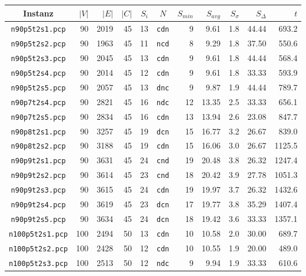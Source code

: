 \documentclass[paper=a4,fontsize=12pt]{scrartcl}
\begin{document}
\begin{table}[!htbp]
\centering
\begin{tabular}{c|rrr|r|c|rrr|r|r}
Instanz & $|V|$ & $|E|$ & $|C|$ & $S_i$ & $N$ & $S_{min}$ & $S_{avg}$ & $S_{\sigma}$ & $S_{\Delta}$ & $t$ \\
\hline\hline
\texttt{n90p5t2s1.pcp} & 90	& 2019	& 45 & 13 & \texttt{cdn} & 9 & 9.61 & 1.8 & 44.44 & 693.2\\
\texttt{n90p5t2s2.pcp} & 90	& 1963	& 45 & 11 & \texttt{ncd} & 8 & 9.29 & 1.8 & 37.50 & 550.6\\
\texttt{n90p5t2s3.pcp} & 90	& 2045	& 45 & 13 & \texttt{cdn} & 9 & 9.61 & 1.8 & 44.44 & 568.4\\
\texttt{n90p5t2s4.pcp} & 90	& 2014	& 45 & 12 & \texttt{cdn} & 9 & 9.61 & 1.8 & 33.33 & 593.9\\
\texttt{n90p5t2s5.pcp} & 90	& 2057	& 45 & 13 & \texttt{dnc} & 9 & 9.87 & 1.9 & 44.44 & 789.7\\
\texttt{n90p7t2s4.pcp} & 90	& 2821	& 45 & 16 & \texttt{ndc} & 12 & 13.35 & 2.5 & 33.33 & 656.1\\
\texttt{n90p7t2s5.pcp} & 90	& 2834	& 45 & 16 & \texttt{cdn} & 13 & 13.94 & 2.6 & 23.08 & 847.7\\
\texttt{n90p8t2s1.pcp} & 90	& 3257	& 45 & 19 & \texttt{dcn} & 15 & 16.77 & 3.2 & 26.67 & 839.0\\
\texttt{n90p8t2s2.pcp} & 90	& 3188	& 45 & 19 & \texttt{cdn} & 15 & 16.06 & 3.0 & 26.67 & 1125.5\\
\texttt{n90p9t2s1.pcp} & 90	& 3631	& 45	& 24 & \texttt{cnd} & 19 & 20.48 & 3.8 & 26.32 & 1247.4\\
\texttt{n90p9t2s2.pcp} & 90	& 3614	& 45	& 23 & \texttt{cnd} & 18 & 20.42 & 3.9 & 27.78 & 1051.3\\
\texttt{n90p9t2s3.pcp} & 90	& 3615	& 45	& 24 & \texttt{cdn} & 19 & 19.97 & 3.7 & 26.32 & 1432.6\\
\texttt{n90p9t2s4.pcp} & 90	& 3619	& 45	& 23 & \texttt{dcn} & 17 & 19.77 & 3.8 & 35.29 & 1407.4\\
\texttt{n90p9t2s5.pcp} & 90	& 3634	& 45	& 24 & \texttt{dcn} & 18 & 19.42 & 3.6 & 33.33 & 1357.1\\
\texttt{n100p5t2s1.pcp} & 100	& 2494	& 50	& 13 & \texttt{cdn} & 10 & 10.58 & 2.0 & 30.00 & 689.7\\
\texttt{n100p5t2s2.pcp} & 100	& 2428	& 50	& 12 & \texttt{cdn} & 10 & 10.55 & 1.9 & 20.00 & 489.0\\
\texttt{n100p5t2s3.pcp} & 100	& 2513	& 50	& 12 & \texttt{ndc} & 9 & 9.94 & 1.9 & 33.33 & 610.6\\

\end{tabular}
\end{table}
\end{document}
